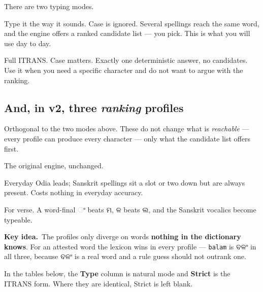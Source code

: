 \documentclass[11pt, a4paper]{article}
\newcommand{\od}[1]{{\odiafont #1}}          %
\newcommand{\kidea}{{\color{midseagreen}\textbf{\textsf{Key idea.}}}\ }
\begin{document}
There are two typing modes.

\begin{description}[leftmargin=1.4cm, style=nextline, itemsep=0.3em]
  \item[Natural mode \normalfont(default)] Type it the way it sounds. Case is ignored.
  Several spellings reach the same word, and the engine offers a ranked candidate list
  --- you pick. This is what you will use day to day.
  \item[Strict mode \normalfont(\texttt{-{}-strict})] Full ITRANS. Case matters. Exactly
  one deterministic answer, no candidates. Use it when you need a specific character and
  do not want to argue with the ranking.
\end{description}

\subsection*{And, in v2, three \emph{ranking} profiles}

Orthogonal to the two modes above. These do not change what is \emph{reachable} --- every
profile can produce every character --- only what the candidate list offers first.

\begin{description}[leftmargin=1.4cm, style=nextline, itemsep=0.3em]
  \item[Everyday] The original engine, unchanged.
  \item[Odia + Sanskrit \normalfont(default)] Everyday Odia leads; Sanskrit spellings sit
  a slot or two down but are always present. Costs nothing in everyday accuracy.
  \item[Sloka] For verse. A word-final \od{ଂ} beats \od{ମ}, \od{ଳ} beats \od{ଲ}, and the
  Sanskrit vocalics become typeable.
\end{description}

\begin{keybox}
\kidea The profiles only diverge on words \textbf{nothing in the dictionary knows}. For an
attested word the lexicon wins in every profile --- \texttt{balam} is \od{ବଳଂ} in all
three, because \od{ବଳଂ} is a real word and a rule guess should not outrank one.
\end{keybox}

In the tables below, the \textbf{Type} column is natural mode and \textbf{Strict} is the
ITRANS form. Where they are identical, Strict is left blank.

\end{document}
